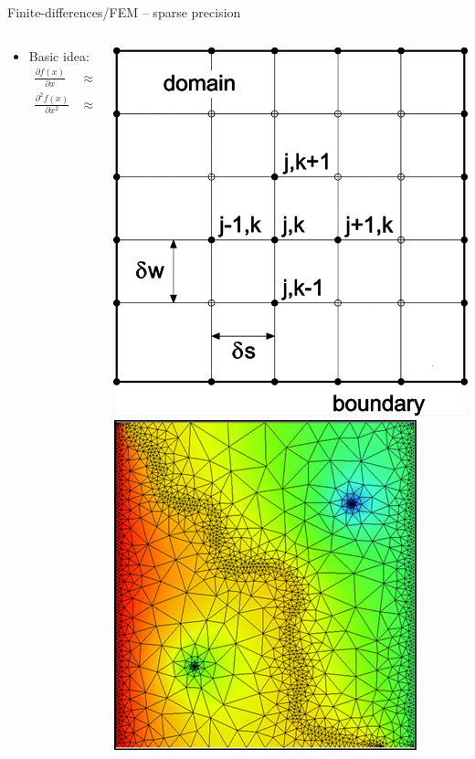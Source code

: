 \documentclass[first=dgreen,second=purple,presentation]{elecslides}
\begin{document}
\begin{frame}{Finite-differences/FEM -- sparse precision}

\begin{block}{}
\begin{columns}
\begin{column}{0.55\textwidth}
\begin{itemize}[<+->]
\item Basic idea:
{\small
\begin{equation}
\begin{split}
  \frac{\partial f(x)}{\partial x} & \approx \frac{f(x + h) - f(x)}{h} \\
  \frac{\partial^2 f(x)}{\partial x^2} & \approx \frac{f(x + h) - 2 f(x) + f(x - h)}{h^2} \\
\end{split}
\nonumber
\end{equation}
}
\end{itemize}
\end{column}
\begin{column}{0.45\textwidth}
\includegraphics[width=0.45\columnwidth]{fd}
\includegraphics[width=0.45\columnwidth]{fem}
\end{column}
\end{columns}
\end{block}


\end{frame}
\end{document}
